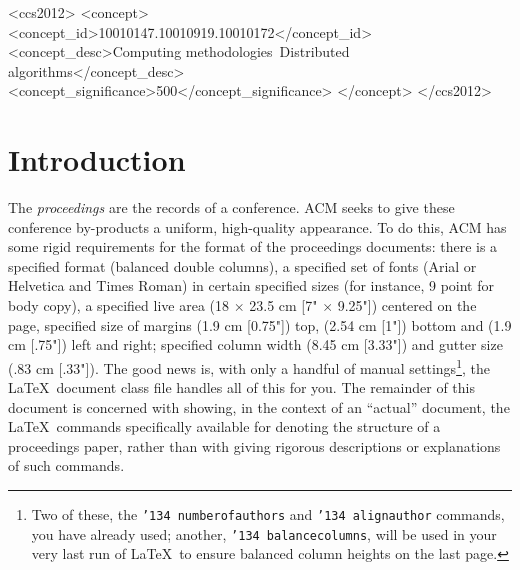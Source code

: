 \documentclass{sig-alternate-05-2015}
\begin{document}
\begin{CCSXML}
<ccs2012>
	<concept>
		<concept_id>10010147.10010919.10010172</concept_id>
		<concept_desc>Computing methodologies~Distributed algorithms</concept_desc>
		<concept_significance>500</concept_significance>
	</concept>
</ccs2012>
\end{CCSXML}

\printccsdesc


\section{Introduction}
The \textit{proceedings} are the records of a conference. ACM seeks to give these conference by-products a uniform, high-quality appearance.  To do this, ACM has some rigid requirements for the format of the proceedings documents: there is a specified format (balanced  double columns), a specified set of fonts (Arial or Helvetica and Times Roman) in certain specified sizes (for instance, 9 point for body copy), a specified live area (18 $\times$ 23.5 cm [7" $\times$ 9.25"]) centered on the page, specified size of margins (1.9 cm [0.75"]) top, (2.54 cm [1"]) bottom and (1.9 cm [.75"]) left and right; specified column width (8.45 cm [3.33"]) and gutter size (.83 cm [.33"]). The good news is, with only a handful of manual settings\footnote{Two of these, the {\texttt{\char'134 numberofauthors}} and {\texttt{\char'134 alignauthor}} commands, you have already used; another, {\texttt{\char'134 balancecolumns}}, will be used in your very last run of \LaTeX\ to ensure balanced column heights on the last page.}, the \LaTeX\ document class file handles all of this for you.
The remainder of this document is concerned with showing, in the context of an ``actual'' document, the \LaTeX\ commands specifically available for denoting the structure of a proceedings paper, rather than with giving rigorous descriptions or explanations of such commands.
\end{document}
